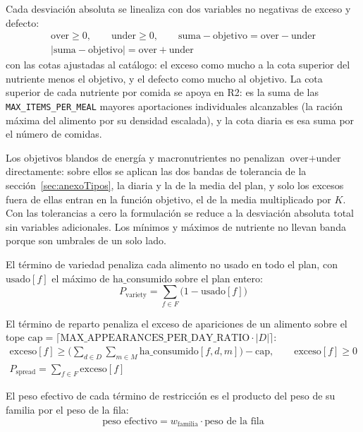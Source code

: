 Cada desviación absoluta se linealiza con dos variables no negativas de exceso y defecto:
\begin{gather*}
\text{over} \ge 0, \qquad \text{under} \ge 0, \qquad \text{suma} - \text{objetivo} = \text{over} - \text{under} \\
|\text{suma} - \text{objetivo}| = \text{over} + \text{under}
\end{gather*}
con las cotas ajustadas al catálogo: el exceso como mucho a la cota superior del nutriente menos el objetivo, y el defecto como mucho al objetivo. La cota superior de cada nutriente por comida se apoya en R2: es la suma de las \texttt{MAX\_ITEMS\_PER\_MEAL} mayores aportaciones individuales alcanzables (la ración máxima del alimento por su densidad escalada), y la cota diaria es esa suma por el número de comidas.

Los objetivos blandos de energía y macronutrientes no penalizan $\text{over} + \text{under}$ directamente: sobre ellos se aplican las dos bandas de tolerancia de la sección~\ref{sec:anexoTipos}, la diaria y la de la media del plan, y solo los excesos fuera de ellas entran en la función objetivo, el de la media multiplicado por $K$. Con las tolerancias a cero la formulación se reduce a la desviación absoluta total sin variables adicionales. Los mínimos y máximos de nutriente no llevan banda porque son umbrales de un solo lado.

El término de variedad penaliza cada alimento no usado en todo el plan, con $\text{usado}[f]$ el máximo de $\text{ha\_consumido}$ sobre el plan entero:
\begin{equation*}
P_{\text{variety}} = \sum_{f \in F} \big(1 - \text{usado}[f]\big)
\end{equation*}

El término de reparto penaliza el exceso de apariciones de un alimento sobre el tope $\text{cap} = \lceil \text{MAX\_APPEARANCES\_PER\_DAY\_RATIO} \cdot |D| \rceil$:
\begin{gather*}
\text{exceso}[f] \ge \Big(\sum_{d \in D}\sum_{m \in M} \text{ha\_consumido}[f,d,m]\Big) - \text{cap}, \qquad \text{exceso}[f] \ge 0 \\
P_{\text{spread}} = \sum_{f \in F} \text{exceso}[f]
\end{gather*}

El peso efectivo de cada término de restricción es el producto del peso de su familia por el peso de la fila:
\begin{equation*}
\text{peso efectivo} = w_{\text{familia}} \cdot \text{peso de la fila}
\end{equation*}

